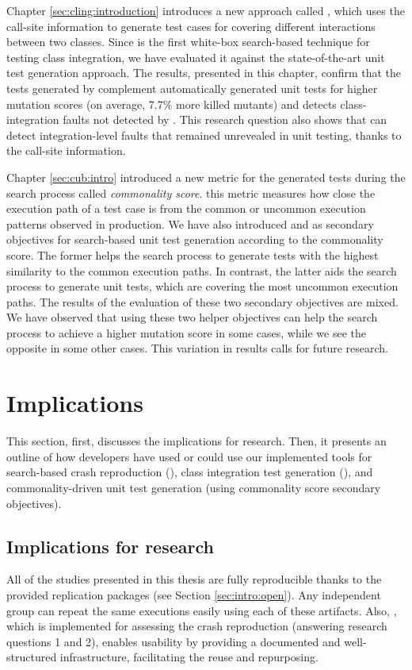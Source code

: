 Chapter \ref{sec:cling:introduction} introduces a new approach called \cling, which uses the call-site information to generate test cases for covering different interactions between two classes. Since \cling is the first white-box search-based technique for testing class integration, we have evaluated it against the state-of-the-art unit test generation approach. The results, presented in this chapter, confirm that the tests generated by \cling complement automatically generated unit tests for higher mutation scores (on average, 7.7\% more killed mutants) and detects class-integration faults not detected by \evosuite. This research question also shows that \cling can detect integration-level faults that remained unrevealed in unit testing, thanks to the call-site information.


Chapter \ref{sec:cub:intro} introduced a new metric for the generated tests during the search process called \emph{commonality score}. this metric measures how close the execution path of a test case is from the common or uncommon execution patterns observed in production. We have also introduced \com and \ucom as secondary objectives for search-based unit test generation according to the commonality score. The former helps the search process to generate tests with the highest similarity to the common execution paths. In contrast, the latter aids the search process to generate unit tests, which are covering the most uncommon execution paths. The results of the evaluation of these two secondary objectives are mixed. We have observed that using these two helper objectives can help the search process to achieve a higher mutation score in some cases, while we see the opposite in some other cases. This variation in results calls for future research.



\section{Implications}

This section, first, discusses the implications for research. Then, it presents an outline of how developers have used or could use our implemented tools for search-based crash reproduction (\botsing), class integration test generation (\cling), and commonality-driven unit test generation (using commonality score secondary objectives).

\subsection{Implications for research}
All of the studies presented in this thesis are fully reproducible thanks to the provided replication packages (see Section \ref{sec:intro:open}). Any independent group can repeat the same executions easily using each of these artifacts.
Also, \exrunner, which is implemented for assessing the crash reproduction (answering research questions 1 and 2), enables usability by providing a documented and well-structured infrastructure, facilitating the reuse and repurposing.



